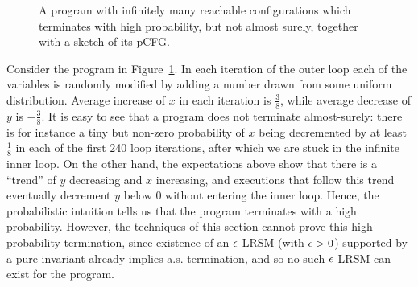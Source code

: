 \begin{figure}[t]
\begin{tikzpicture}[x = 1.7cm]



\end{tikzpicture}
\caption{A program with infinitely many reachable configurations which 
terminates with high probability, but not almost 
surely, together with a sketch of its pCFG. }\label{fig:nonterm}
\end{figure}


\smallskip
\begin{example}\label{ex:nonterm}
Consider the program in Figure~\ref{fig:nonterm}. 
In each 
iteration of the outer loop each of the variables is randomly modified by 
adding a number drawn from some uniform distribution.
Average increase of $x$ in each iteration is $\frac{3}{8}$, while average decrease 
of $y$ is $-\frac{3}{8}$.  It is easy to see that a program does not 
terminate almost-surely: 
there is for instance a tiny but non-zero probability of $x$ being decremented 
by at least $\frac{1}{8}$ in 
each of the first 240 loop iterations, after which we are stuck in the infinite 
inner 
loop. On 
the other hand, the expectations above show that there is a ``trend'' of $y$ 
decreasing and $x$ increasing, and executions that follow this trend eventually 
decrement $y$ below $0$ without entering the inner loop. Hence, the 
probabilistic intuition tells us that the program terminates with a high 
probability. However, the techniques of this section cannot prove 
this high-probability termination, since existence of an $\eps$-LRSM (with 
$\eps>0$) supported by a pure invariant already implies a.s. termination,
and so no such $\eps$-LRSM can exist for the program. 
\end{example}

